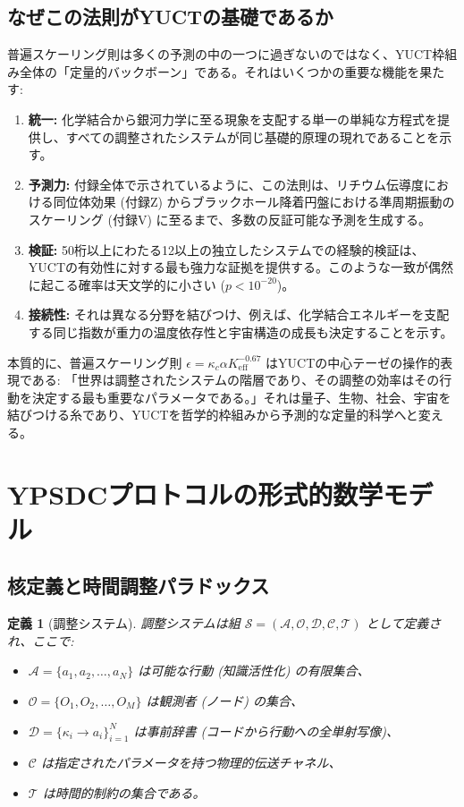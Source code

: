 \documentclass[11pt,a4paper]{article}
\newtheorem{definition}{定義}
\begin{document}
	\subsection{なぜこの法則がYUCTの基礎であるか}
	
	普遍スケーリング則は多くの予測の中の一つに過ぎないのではなく、YUCT枠組み全体の「定量的バックボーン」である。それはいくつかの重要な機能を果たす:
	\begin{enumerate}
		\item \textbf{統一:} 化学結合から銀河力学に至る現象を支配する単一の単純な方程式を提供し、すべての調整されたシステムが同じ基礎的原理の現れであることを示す。
		\item \textbf{予測力:} 付録全体で示されているように、この法則は、リチウム伝導度における同位体効果 (付録Z) からブラックホール降着円盤における準周期振動のスケーリング (付録V) に至るまで、多数の反証可能な予測を生成する。
		\item \textbf{検証:} 50桁以上にわたる12以上の独立したシステムでの経験的検証は、YUCTの有効性に対する最も強力な証拠を提供する。このような一致が偶然に起こる確率は天文学的に小さい ($p < 10^{-20}$)。
		\item \textbf{接続性:} それは異なる分野を結びつけ、例えば、化学結合エネルギーを支配する同じ指数が重力の温度依存性と宇宙構造の成長も決定することを示す。
	\end{enumerate}
	
	本質的に、普遍スケーリング則 $\epsilon = \kappa_c \alpha K_{\mathrm{eff}}^{-0.67}$ はYUCTの中心テーゼの操作的表現である: 「世界は調整されたシステムの階層であり、その調整の効率はその行動を決定する最も重要なパラメータである。」それは量子、生物、社会、宇宙を結びつける糸であり、YUCTを哲学的枠組みから予測的な定量的科学へと変える。
	
	\section{YPSDCプロトコルの形式的数学モデル}
	\label{sec:formal-model}
	
	\subsection{核定義と時間調整パラドックス}
	
	\begin{definition}[調整システム]
		調整システムは組 $\mathcal{S} = (\mathcal{A}, \mathcal{O}, \mathcal{D}, \mathcal{C}, \mathcal{T})$ として定義され、ここで:
		\begin{itemize}
			\item $\mathcal{A} = \{a_1, a_2, \dots, a_N\}$ は可能な行動 (知識活性化) の有限集合、
			\item $\mathcal{O} = \{O_1, O_2, \dots, O_M\}$ は観測者 (ノード) の集合、
			\item $\mathcal{D} = \{\kappa_i \to a_i\}_{i=1}^N$ は事前辞書 (コードから行動への全単射写像)、
			\item $\mathcal{C}$ は指定されたパラメータを持つ物理的伝送チャネル、
			\item $\mathcal{T}$ は時間的制約の集合である。
		\end{itemize}
	\end{definition}
	
\end{document}
